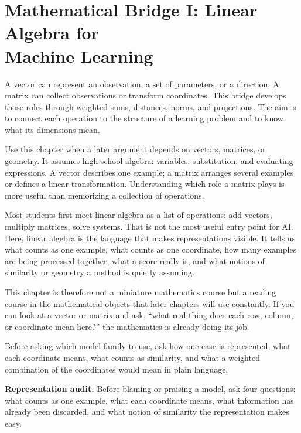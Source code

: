\chapter*{Mathematical Bridge I: Linear Algebra for\texorpdfstring{\\}{ }Machine Learning}

A vector can represent an observation, a set of parameters, or a direction. A matrix can collect observations or transform coordinates. This bridge develops those roles through weighted sums, distances, norms, and projections. The aim is to connect each operation to the structure of a learning problem and to know what its dimensions mean.

\begin{prereqbridge}
Use this chapter when a later argument depends on vectors, matrices, or geometry. It assumes high-school algebra: variables, substitution, and evaluating expressions. A vector describes one example; a matrix arranges several examples or defines a linear transformation. Understanding which role a matrix plays is more useful than memorizing a collection of operations.
\end{prereqbridge}

Most students first meet linear algebra as a list of operations: add vectors, multiply matrices, solve systems. That is not the most useful entry point for AI. Here, linear algebra is the language that makes representations visible. It tells us what counts as one example, what counts as one coordinate, how many examples are being processed together, what a score really is, and what notions of similarity or geometry a method is quietly assuming.

This chapter is therefore not a miniature mathematics course but a reading course in the mathematical objects that later chapters will use constantly. If you can look at a vector or matrix and ask, ``what real thing does each row, column, or coordinate mean here?'' the mathematics is already doing its job.

Before asking which model family to use, ask how one case is represented, what each coordinate means, what counts as similarity, and what a weighted combination of the coordinates would mean in plain language.

\textbf{Representation audit.} Before blaming or praising a model, ask four questions: what counts as one example, what each coordinate means, what information has already been discarded, and what notion of similarity the representation makes easy.

